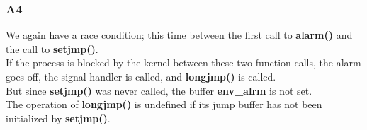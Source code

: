 \documentclass{article}
\begin{document}
\subsubsection{A4\label{a4}}
We again have a race condition; this time between the first call to \textbf{alarm()} and the call to \textbf{setjmp()}. \\

If the process is blocked by the kernel between these two function calls, the alarm goes off, the signal handler is called, and \textbf{longjmp()} is called. \\

But since \textbf{setjmp()} was never called, the buffer \textbf{env\_alrm} is not set. \\
 
The operation of \textbf{longjmp()} is undefined if its jump buffer has not been initialized by \textbf{setjmp()}. \\
\end{document}
